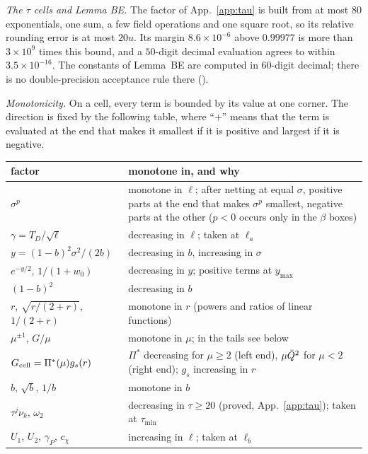 \emph{The $\tau$ cells and Lemma BE.}
The factor of App.~\ref{app:tau} is built from at most $80$ exponentials, one sum, a few field operations and one square root, so its relative rounding error is at most $20u$.
Its margin $8.6\times10^{-6}$ above $0.99977$ is more than $3\times10^{9}$ times this bound, and a $50$-digit decimal evaluation agrees to within $3.5\times10^{-16}$.
The constants of Lemma~BE are computed in $60$-digit decimal; there is no double-precision acceptance rule there ().

\emph{Monotonicity.}
On a cell, every term is bounded by its value at one corner.
The direction is fixed by the following table, where ``$+$'' means that the term is evaluated at the end that makes it smallest if it is positive and largest if it is negative.

\begin{center}
\small
\begin{tabular}{p{}p{}}
factor & monotone in, and why\\ \hline
$\sigma^p$ & monotone in $\ell$; after netting at equal $\sigma$, positive parts at the end that makes $\sigma^p$ smallest, negative parts at the other ($p<0$ occurs only in the $\beta$ boxes)\\
$\gamma=T_D/\sqrt\ell$ & decreasing in $\ell$; taken at $\ell_a$\\
$y=(1-b)^2\sigma^2/(2b)$ & decreasing in $b$, increasing in $\sigma$\\
$e^{-y/2}$, $1/(1+w_0)$ & decreasing in $y$; positive terms at $y_{\max}$\\
$(1-b)^2$ & decreasing in $b$\\
$r$, $\sqrt{r/(2+r)}$, $1/(2+r)$ & monotone in $r$ (powers and ratios of linear functions)\\
$\mu^{\pm1}$, $G/\mu$ & monotone in $\mu$; in the tails see below\\
$G_{\rm cell}=\Pi^*(\mu)g_s(r)$ & $\Pi^*$ decreasing for $\mu\ge2$ (left end), $\mu\bar Q^2$ for $\mu<2$ (right end); $g_s$ increasing in $r$\\
$b$, $\sqrt b$, $1/b$ & monotone in $b$\\
$\tau^j\nu_k$, $\omega_2$ & decreasing in $\tau\ge20$ (proved, App.~\ref{app:tau}); taken at $\tau_{\min}$\\
$U_1$, $U_2$, $\gamma_P$, $c_\chi$ & increasing in $\ell$; taken at $\ell_b$\\
\end{tabular}
\end{center}
